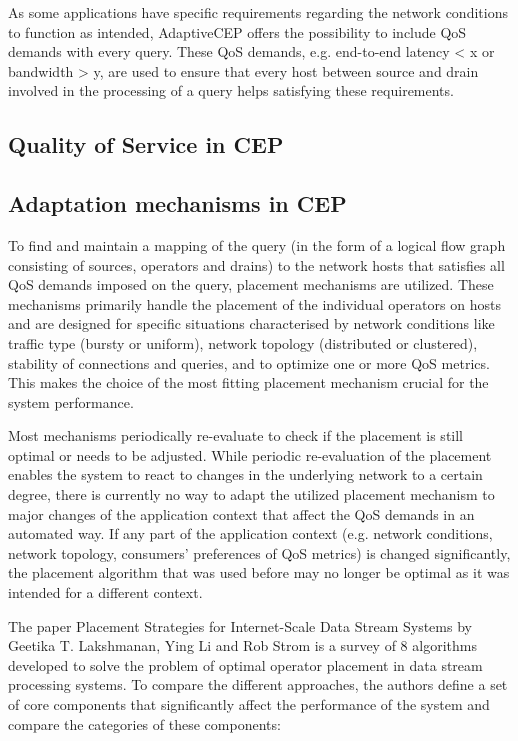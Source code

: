 As some applications have specific requirements regarding the network conditions to function as intended, AdaptiveCEP offers the possibility to include QoS demands with every query. These QoS demands, e.g. end-to-end latency < x or bandwidth > y, are used to ensure that every host between source and drain involved in the processing of a query helps satisfying these requirements. 

\subsection{Quality of Service in CEP}
\subsection{Adaptation mechanisms in CEP}

To find and maintain a mapping of the query (in the form of a logical flow graph consisting of sources, operators and drains) to the network hosts that satisfies all QoS demands imposed on the query, placement mechanisms are utilized. 
These mechanisms primarily handle the placement of the individual operators on hosts and are designed  for specific situations characterised by network conditions like traffic type (bursty or uniform), network topology (distributed or clustered), stability of connections and queries, and to optimize one or more QoS metrics. This makes the choice of the most fitting placement mechanism crucial for the system performance. 

Most mechanisms periodically re-evaluate to check if the placement is still optimal or needs to be adjusted. While periodic re-evaluation of the placement enables the system to react to changes in the underlying network to a certain degree, there is currently no way to adapt the utilized placement mechanism to major changes of the application context that affect the QoS demands in an automated way.
If any part of the application context (e.g. network conditions, network topology, consumers' preferences of QoS metrics) is changed significantly, the placement algorithm that was used before may no longer be optimal as it was intended for a different context.

The paper Placement Strategies for Internet-Scale Data Stream Systems  by Geetika T. Lakshmanan, Ying Li and Rob Strom is a survey of 8 algorithms developed to solve the problem of optimal operator placement in data stream processing systems. To compare the different approaches, the authors define a set of core components that significantly affect the performance of the system and compare the categories of these components: 

